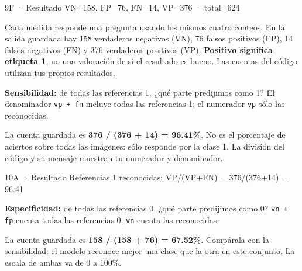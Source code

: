 
\begin{Salida}{9F · Resultado}
VN=158, FP=76, FN=14, VP=376 · total=624
\end{Salida}

\label{bloque-10}

Cada medida responde una pregunta usando los mismos cuatro conteos. En la salida guardada hay 158 verdaderos negativos (VN), 76 falsos positivos (FP), 14 falsos negativos (FN) y 376 verdaderos positivos (VP). \textbf{Positivo significa etiqueta 1}, no una valoración de si el resultado es bueno. Las cuentas del código utilizan tus propios resultados.


\label{paso-10a}

\textbf{Sensibilidad:} de todas las referencias 1, ¿qué parte predijimos como 1? El denominador \texttt{\small vp + fn} incluye todas las referencias 1; el numerador \texttt{\small vp} sólo las reconocidas.

La cuenta guardada es \textbf{376 / (376 + 14) = 96.41\%}. No es el porcentaje de aciertos sobre todas las imágenes: sólo responde por la clase 1. La división del código y su mensaje muestran tu numerador y denominador.



\begin{Salida}{10A · Resultado}
Referencias 1 reconocidas: VP/(VP+FN) = 376/(376+14) = 96.41%
\end{Salida}

\label{paso-10b}

\textbf{Especificidad:} de todas las referencias 0, ¿qué parte predijimos como 0? \texttt{\small vn + fp} cuenta todas las referencias 0; \texttt{\small vn} cuenta las reconocidas.

La cuenta guardada es \textbf{158 / (158 + 76) = 67.52\%}. Compárala con la sensibilidad: el modelo reconoce mejor una clase que la otra en este conjunto. La escala de ambas va de 0 a 100\%.


